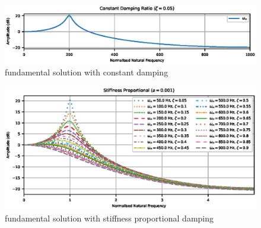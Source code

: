 \begin{figure}[ht]
\centering
\includegraphics{PIC/ConstantProportional5000}
\caption{fundamental solution with constant damping}\label{fig:constant_damping}
\end{figure}

\begin{figure}[ht]
\centering
\includegraphics{PIC/StiffnessProportional100}
\caption{fundamental solution with stiffness proportional damping}\label{fig:k_proportional}
\end{figure}